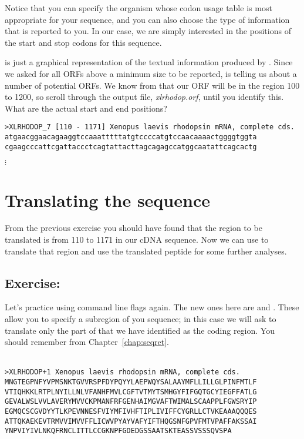 \documentclass[12pt]{report}
\begin{document}
Notice that you can specify the organism whose codon usage table is
most appropriate for your sequence, and you can also choose the type
of information that is reported to you. In our case, we are simply
interested in the positions of the start and stop codons for this
sequence.

 is just a graphical representation of the textual 
information produced by . Since we asked for all ORFs
above a minimum size to be reported,  is telling us about
a number of potential ORFs. We know from  that our ORF
will be in the region 100 to 1200, so scroll through the output file,
{\em xlrhodop.orf}, until you identify this. What are the actual start
and end positions?

\unix{}
\begin{verbatim}
>XLRHODOP_7 [110 - 1171] Xenopus laevis rhodopsin mRNA, complete cds.
atgaacggaacagaaggtccaaatttttatgtccccatgtccaacaaaactggggtggta
cgaagcccattcgattaccctcagtattacttagcagagccatggcaatattcagcactg
\end{verbatim}
$\vdots$

\section{Translating the sequence}

From the previous exercise you should have found that the region to be
translated is from 110 to 1171 in our cDNA sequence. Now we can use
 to translate that region and use the translated
peptide for some further analyses. 

\subsection*{Exercise: }

Let's practice using command line flags again. The new ones here are
 and . These allow you to specify a
subregion of you sequence; in this case we will ask
 to translate only the part of
 that we have identified as the coding
region. You should remember  from
Chapter~\ref{chap:seqret}.\\

\unix{}\\

\unix{}
\begin{verbatim}
>XLRHODOP+1 Xenopus laevis rhodopsin mRNA, complete cds.
MNGTEGPNFYVPMSNKTGVVRSPFDYPQYYLAEPWQYSALAAYMFLLILLGLPINFMTLF
VTIQHKKLRTPLNYILLNLVFANHFMVLCGFTVTMYTSMHGYFIFGQTGCYIEGFFATLG
GEVALWSLVVLAVERYMVVCKPMANFRFGENHAIMGVAFTWIMALSCAAPPLFGWSRYIP
EGMQCSCGVDYYTLKPEVNNESFVIYMFIVHFTIPLIVIFFCYGRLLCTVKEAAAQQQES
ATTQKAEKEVTRMVVIMVVFFLICWVPYAYVAFYIFTHQGSNFGPVFMTVPAFFAKSSAI
YNPVIYIVLNKQFRNCLITTLCCGKNPFGDEDGSSAATSKTEASSVSSSQVSPA
\end{verbatim}
\end{document}

